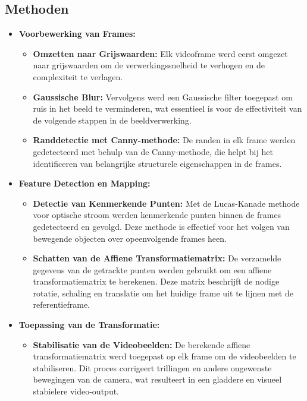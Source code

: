 \subsection{Methoden}
\begin{itemize}
  \item \textbf{Voorbewerking van Frames:}
  \begin{itemize}
    \item \textbf{Omzetten naar Grijswaarden:} Elk videoframe werd eerst omgezet naar grijswaarden om de verwerkingssnelheid te verhogen en de complexiteit te verlagen.
    \item \textbf{Gaussische Blur:} Vervolgens werd een Gaussische filter toegepast om ruis in het beeld te verminderen, wat essentieel is voor de effectiviteit van de volgende stappen in de beeldverwerking.
    \item \textbf{Randdetectie met Canny-methode:} De randen in elk frame werden gedetecteerd met behulp van de Canny-methode, die helpt bij het identificeren van belangrijke structurele eigenschappen in de frames.
  \end{itemize}
  \item \textbf{Feature Detection en Mapping:}
  \begin{itemize}
    \item \textbf{Detectie van Kenmerkende Punten:} Met de Lucas-Kanade methode voor optische stroom werden kenmerkende punten binnen de frames gedetecteerd en gevolgd. Deze methode is effectief voor het volgen van bewegende objecten over opeenvolgende frames heen.
    \item \textbf{Schatten van de Affiene Transformatiematrix:} De verzamelde gegevens van de getrackte punten werden gebruikt om een affiene transformatiematrix te berekenen. Deze matrix beschrijft de nodige rotatie, schaling en translatie om het huidige frame uit te lijnen met de referentieframe.
  \end{itemize}
  \item \textbf{Toepassing van de Transformatie:}
  \begin{itemize}
    \item \textbf{Stabilisatie van de Videobeelden:} De berekende affiene transformatiematrix werd toegepast op elk frame om de videobeelden te stabiliseren. Dit proces corrigeert trillingen en andere ongewenste bewegingen van de camera, wat resulteert in een gladdere en visueel stabielere video-output.
  \end{itemize}
\end{itemize}

